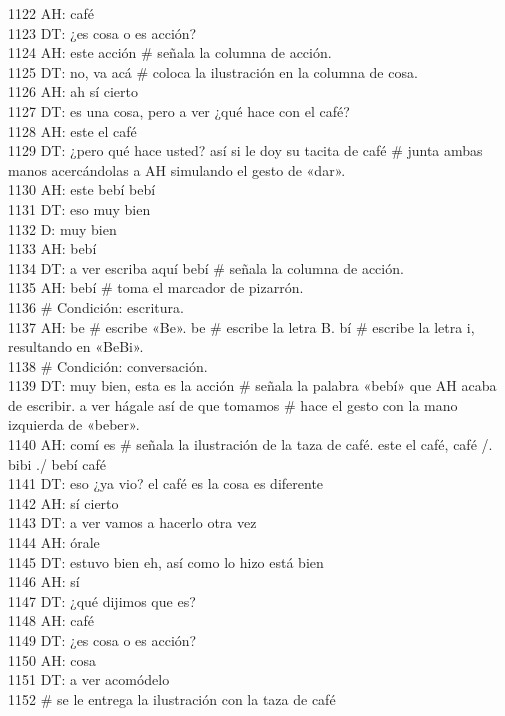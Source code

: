 1122 AH: café\\
1123 DT: ¿es cosa o es acción?\\
1124 AH: este acción # señala la columna de acción.\\
1125 DT: no, va acá # coloca la ilustración en la columna de cosa.\\
1126 AH: ah sí cierto\\
1127 DT: es una cosa, pero a ver ¿qué hace con el café?\\
1128 AH: este el café\\
1129 DT: ¿pero qué hace usted? así si le doy su tacita de café # junta ambas manos acercándolas a AH simulando el gesto de «dar».\\
1130 AH: este bebí bebí\\
1131 DT: eso muy bien\\
1132 D: muy bien\\
1133 AH: bebí\\
1134 DT: a ver escriba aquí bebí # señala la columna de acción.\\
1135 AH: bebí # toma el marcador de pizarrón.\\
1136 # Condición: escritura.\\
1137 AH: be # escribe «Be». be # escribe la letra B. bí # escribe la letra i, resultando en «BeBi».\\
1138 # Condición: conversación.\\
1139 DT: muy bien, esta es la acción # señala la palabra «bebí» que AH acaba de escribir. a ver hágale así de que tomamos # hace el gesto con la mano izquierda de «beber».\\
1140 AH: comí es # señala la ilustración de la taza de café. este el café, café /. bibi ./ bebí café\\
1141 DT: eso ¿ya vio? el café es la cosa es diferente\\
1142 AH: sí cierto\\
1143 DT: a ver vamos a hacerlo otra vez\\
1144 AH: órale\\
1145 DT: estuvo bien eh, así como lo hizo está bien\\
1146 AH: sí\\
1147 DT: ¿qué dijimos que es?\\
1148 AH: café\\
1149 DT: ¿es cosa o es acción?\\
1150 AH: cosa\\
1151 DT: a ver acomódelo\\
1152 # se le entrega la ilustración con la taza de café\\
